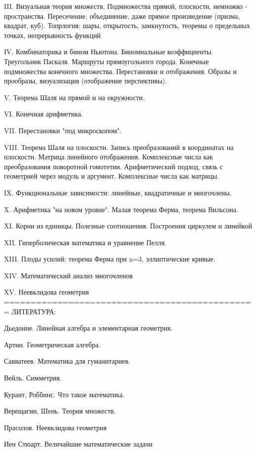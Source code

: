 III. Визуальная теория множеств. Подмножества прямой, плоскости,
немножко - пространства. Пересечение, объединение, даже прямое 
произведение (призма, квадрат, куб). Топрлогия: шары, открытость,
замкнутость, теоремы о предельных точках, непрерывность функций

IV. Комбинаторика и бином Ньютона. Биномиальные коэффициенты.
Треугольник Паскаля. Маршруты прямоугольного города. Конечные
подмножества конечного множества. Перестановки и отображения.
Образы и прообразы, визуализация (отображение перспективы).

V. Теорема Шаля на прямой и на окружности.

VI. Конечная арифметика.

VII. Перестановки "под микроскопом".

VIII. Теорема Шаля на плоскости. Запись преобразований в координатах
на плоскости. Матрица линейного отображения. Комплексные числа как 
преобразования поворотной гомотетии. Арифметический подход, связь
с геометрией через модуль и аргумент. Комплексные числа как матрицы.

IX. Функциональные зависимости: линейные, квадратичные и многочлены.

X. Арифметика "на новом уровне". Малая теорема Ферма, теорема Вильсона.

XI. Корни из единицы. Полезные соотношения. Построения циркулем и линейкой

XII. Гиперболическая математика и уравнение Пелля.

XIII. Плоды усилий: теорема Ферма при n=3, эллиптические кривые.

XIV. Математический анализ многочленов

XV. Неевклидова геометрия
===============================================
ЛИТЕРАТУРА:

Дьедонне. Линейная алгебра и элементарная геометрия.

Артин. Геометрическая алгебра.

Савватеев. Математика для гуманитариев.

Вейль. Симметрия.

Курант, Роббинс. Что такое математика.

Верещагин, Шень. Теория множеств.

Прасолов. Неевклидова геометрия

Иен Стюарт. Величайшие математические задачи